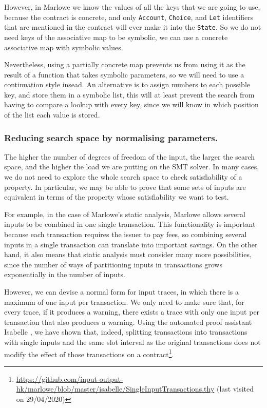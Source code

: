 \documentclass[english,runningheads]{llncs}
\begin{document}
However, in Marlowe we know the values of all the keys that we are
going to use, because the contract is concrete, and only \texttt{Account},
\texttt{Choice}, and \texttt{Let} identifiers that are mentioned in
the contract will ever make it into the \texttt{State}. So we do not
need keys of the associative map to be symbolic, we can use a concrete
associative map with symbolic values.

Nevertheless, using a partially concrete map prevents us from using
it as the result of a function that takes symbolic parameters, so
we will need to use a continuation style insead. An alternative is
to assign numbers to each possible key, and store them in a symbolic
list, this will at least prevent the search from having to compare
a lookup with every key, since we will know in which position of the
list each value is stored. 

\subsubsection{Reducing search space by normalising parameters.
\label{subsec:Reducing-search-space-by-normalising-parameters}}

The higher the number of degrees of freedom of the input, the larger
the search space, and the higher the load we are putting on the SMT
solver. In many cases, we do not need to explore the whole search
space to check satisfiability of a property. In particular, we may
be able to prove that some sets of inputs are equivalent in terms
of the property whose satisfiability we want to test.

For example, in the case of Marlowe's static analysis,
Marlowe allows several inputs to be combined in one single transaction.
This functionality is important because each transaction requires
the issuer to pay fees, so combining several inputs in a single transaction
can translate into important savings. On the other hand, it also means
that static analysis must consider many more possibilities, since
the number of ways of partitioning inputs in transactions grows exponentially
in the number of inputs.

However, we can devise a normal form for input traces, in which there
is a maximum of one input per transaction. We only need to make sure
that, for every trace, if it produces a warning, there exists a trace
with only one input per transaction that also produces a warning.
Using the automated proof assistant Isabelle \cite{nipkow2002isabelle},
we have shown that, indeed, splitting transactions into transactions
with single inputs and the same slot interval as the original transactions
does not modify the effect of those transactions on a contract\footnote{\url{https://github.com/input-output-hk/marlowe/blob/master/isabelle/SingleInputTransactions.thy}
(last visited on 29/04/2020)}.
\end{document}
